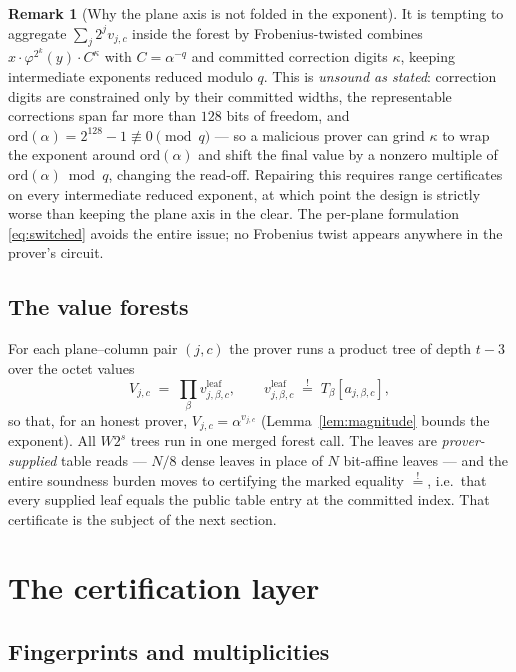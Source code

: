 \documentclass[11pt]{article}
\theoremstyle{definition}
\newtheorem{remark}[theorem]{Remark}
\newcommand{\ord}{\mathrm{ord}}
\begin{document}
\begin{remark}[Why the plane axis is not folded in the exponent]
\label{rem:wraparound}
It is tempting to aggregate $\sum_j 2^j v_{j,c}$ inside the forest by
Frobenius-twisted combines $x\cdot\varphi^{2^k}(y)\cdot C^{\kappa}$ with
$C=\alpha^{-q}$ and committed correction digits $\kappa$, keeping
intermediate exponents reduced modulo $q$. This is \emph{unsound as
stated}: correction digits are constrained only by their committed
widths, the representable corrections span far more than $128$ bits of
freedom, and $\ord(\alpha)=2^{128}-1\not\equiv 0 \pmod q$ --- so a
malicious prover can grind $\kappa$ to wrap the exponent around
$\ord(\alpha)$ and shift the final value by a nonzero multiple of
$\ord(\alpha)\bmod q$, changing the read-off. Repairing this requires
range certificates on every intermediate reduced exponent, at which
point the design is strictly worse than keeping the plane axis in the
clear. The per-plane formulation \eqref{eq:switched} avoids the entire
issue; no Frobenius twist appears anywhere in the prover's circuit.
\end{remark}

\subsection{The value forests}

For each plane--column pair $(j,c)$ the prover runs a product tree of
depth $t-3$ over the octet values
\[
V_{j,c} \;=\; \prod_\beta v^{\mathrm{leaf}}_{j,\beta,c},
\qquad
v^{\mathrm{leaf}}_{j,\beta,c} \;\stackrel{!}{=}\; T_\beta[a_{j,\beta,c}],
\]
so that, for an honest prover, $V_{j,c}=\alpha^{v_{j,c}}$
(Lemma~\ref{lem:magnitude} bounds the exponent). All $W2^s$ trees run in
one merged forest call. The leaves are \emph{prover-supplied} table reads
--- $N/8$ dense leaves in place of $N$ bit-affine leaves --- and the
entire soundness burden moves to certifying the marked equality
$\stackrel{!}{=}$, i.e.\ that every supplied leaf equals the public table
entry at the committed index. That certificate is the subject of the next
section.

\section{The certification layer}\label{sec:cert}

\subsection{Fingerprints and multiplicities}
\end{document}
